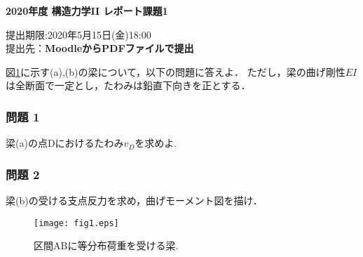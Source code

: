 \documentclass[10pt,a4j]{jarticle}
\newlength{\minitwocolumn}
\begin{document}
\newcommand{\fat}[1]{\mbox{\boldmath $#1$}}
\newcommand{\D}{\partial}
\newcommand{\w}{\omega}
\newcommand{\ga}{\alpha}
\newcommand{\gb}{\beta}
\newcommand{\gx}{\xi}
\newcommand{\gz}{\zeta}
\newcommand{\vhat}[1]{\hat{\fat{#1}}}
\newcommand{\spc}{\vspace{0.7\baselineskip}}
\newcommand{\halfspc}{\vspace{0.3\baselineskip}}

\pagestyle{empty}
\newcommand{\twofig}[2]
 {
   \begin{figure}[here]
     \begin{minipage}[t]{\minitwocolumn}
         \begin{center}   #1
         \end{center}
     \end{minipage}
         \hspace{\columnsep}
     \begin{minipage}[t]{\minitwocolumn}
         \begin{center} #2
         \end{center}
     \end{minipage}
   \end{figure}
 }
\begin{center}
{\Large \bf 2020年度 構造力学II レポート課題1} \\
\end{center}
\begin{flushright}
	提出期限:2020年5月15日(金)18:00\\
	提出先：{\bf MoodleからPDFファイルで提出}
\end{flushright}
\vspace{15mm}
図\ref{fig:fig1}に示す(a),(b)の梁について，以下の問題に答えよ．
ただし，梁の曲げ剛性$EI$は全断面で一定とし，たわみは鉛直下向きを正とする．
\subsubsection*{問題 1}
梁(a)の点Dにおけるたわみ$v_D$を求めよ.
\subsubsection*{問題 2}
梁(b)の受ける支点反力を求め，曲げモーメント図を描け．
\begin{figure}[h]
	\begin{center}
	\texttt{[image: fig1.eps]} 
	\end{center}
	\caption{区間ABに等分布荷重を受ける梁.} 
	\label{fig:fig1}
\end{figure}
\end{document}
